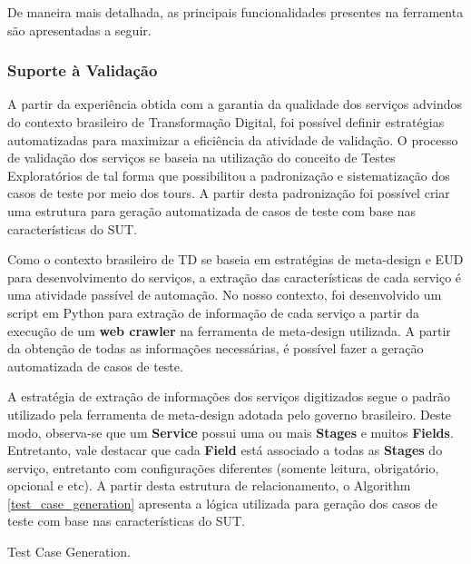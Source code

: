 De maneira mais detalhada, as principais funcionalidades presentes na ferramenta são apresentadas a seguir.

\subsubsection{Suporte à Validação}
\label{sec:teste}

A partir da experiência obtida com a garantia da qualidade dos serviços advindos do contexto brasileiro de Transformação Digital, foi possível definir estratégias automatizadas para maximizar a eficiência da atividade de validação. O processo de validação dos serviços se baseia na utilização do conceito de Testes Exploratórios de tal forma que possibilitou a padronização e sistematização dos casos de teste por meio dos tours. A partir desta padronização foi possível criar uma estrutura para geração automatizada de casos de teste com base nas características do SUT.

Como o contexto brasileiro de TD se baseia em estratégias de meta-design e EUD para desenvolvimento do serviços, a extração das características de cada serviço é uma atividade passível de automação. No nosso contexto, foi desenvolvido um script em Python para extração de informação de cada serviço a partir da execução de um \textbf{web crawler} na ferramenta de meta-design utilizada. A partir da obtenção de todas as informações necessárias, é possível fazer a geração automatizada de casos de teste.

A estratégia de extração de informações dos serviços digitizados segue o padrão utilizado pela ferramenta de meta-design adotada pelo governo brasileiro. Deste modo, observa-se que um \textbf{Service} possui uma ou mais \textbf{Stages} e muitos \textbf{Fields}. Entretanto, vale destacar que cada \textbf{Field} está associado a todas as \textbf{Stages} do serviço, entretanto com configurações diferentes (somente leitura, obrigatório, opcional e etc). A partir desta estrutura de relacionamento, o Algorithm \ref{test_case_generation} apresenta a lógica utilizada para geração dos casos de teste com base nas características do SUT.

    \begin{algorithm}[!htb]


	
	
	
\caption{Test Case Generation.}
\label{test_case_generation}
\end{algorithm}

